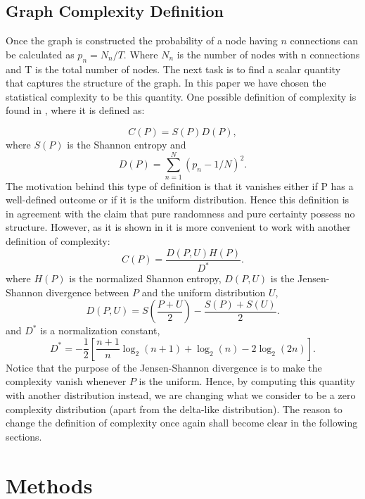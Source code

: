 \documentclass[fleqn,usenatbib]{mnras}
\begin{document}
\subsection{Graph Complexity Definition}

Once the graph is constructed the probability of a node having $n$
connections can be calculated as $p_n=N_{n}/T$. Where $N_{n}$ is the
number of nodes with n connections and T is the total number of
nodes. The next task is to find a scalar quantity that captures the
structure of the graph. In this paper we have chosen the statistical
complexity to be this quantity. One possible definition of complexity
is found in \cite{lopez_comp}, where it is defined as: 

\begin{equation}
	C(P)=S(P)D(P),
\end{equation}
where $S(P)$ is the Shannon entropy and
\begin{equation}
	D(P)=\sum_{n=1}^{N}\left(p_n - 1/N\right)^{2}.
\end{equation}
The motivation behind this type of definition is that it vanishes
either if P has a well-defined outcome or if it is the uniform
distribution.  Hence this definition is in agreement with the claim
that pure randomness and pure certainty possess no structure.  
However, as it is shown in \cite{sig_com} it is more convenient to
work with another definition of complexity: 
\begin{equation}
    C(P)=\frac{D(P,U)H(P)}{D^{*}}.
    \label{eq:comp_def}
\end{equation}
where $H(P)$ is the normalized Shannon entropy, $D(P,U)$ is the
Jensen-Shannon divergence between $P$ and the uniform distribution
$U$, 
\begin{equation}
	D(P,U)=S\left(\frac{P+U}{2}\right) - \frac{S(P)+S(U)}{2}.
\end{equation}
and $D^{*}$ is a normalization constant,
\begin{equation}
    D^{*}=-\frac{1}{2}\left[\frac{n+1}{n}\log_2(n+1)+\log_2(n)-2\log_2(2n)\right].
\end{equation}
Notice that the purpose of the Jensen-Shannon divergence is to make
the complexity vanish whenever $P$ is the uniform. Hence, by computing
this quantity with another distribution instead, we are changing what
we consider to be a zero complexity distribution (apart from the
delta-like distribution). The reason to change the definition of
complexity once again shall become clear in the following sections. 
\section{Methods}
\end{document}
